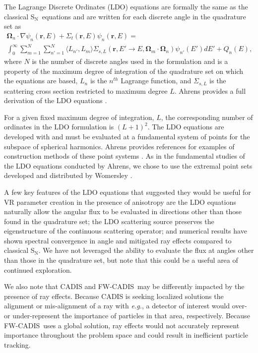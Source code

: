\documentclass{article} %
\newcommand{\bo}{\mathbf\Omega}
\newcommand{\vecr}{\textbf{r}}
\newcommand{\sn}{S$_\mathrm{N}$}
\newcommand{\fwc}{\mbox{FW-CADIS}}
\begin{document}
The Lagrange Discrete Ordinates (LDO) equations are formally the same as the
classical \sn\ equations and are written for each discrete angle in the quadrature
set as
%
\begin{multline}
\bo_n\cdot\nabla\psi_{n}(\vecr,E) + 
\Sigma_{t}(\vecr,E)\psi_{n}(\vecr,E) = \\
\int_0^\infty\sum_{m=1}^{N}\sum_{n'=1}^{N}\langle L_{n'},L_{m}\rangle
\Sigma_{s,L}(\vecr,E'\rightarrow E,\bo_{m}\cdot\bo_n)\psi_{n'}(E')dE'
+ Q_{n}(E),
\end{multline}
%
where $N$ is the number of discrete angles used in the formulation
and is a property of the maximum degree of integration of the quadrature set
on which the equations are based, $L_n$ is the $n^{th}$ Lagrange function, and
$\Sigma_{s,L}$ is the scattering cross section restricted to maximum degree
$L$. Ahrens provides a full derivation of the LDO equations \cite{ahrens}.

For a given fixed maximum degree of integration, $L$, the corresponding number
of ordinates in the LDO formulation is $(L+1)^2$. The LDO equations are
developed with and must be evaluated at a fundamental system of points for the
subspace of spherical harmonics. Ahrens provides references for examples of
construction methods of these point systems \cite{ahrens}. As in the
fundamental studies of the LDO equations conducted by Ahrens, we chose to use
the extremal point sets developed and distributed by Womersley \cite{wom}.

A few key features of the LDO equations that suggested they would be useful for VR parameter creation in the presence of anisotropy are the LDO equations naturally allow the angular flux to be evaluated in directions other than those found in the quadrature set; the LDO scattering source preserves the eigenstructure of the continuous scattering operator; and numerical results have shown spectral convergence in angle and mitigated ray effects compared to classical \sn \citep{ahrens}. We have not leveraged the ability to evaluate the flux at angles other than those in the quadrature set, but note that this could be a useful area of continued exploration. 

We also note that CADIS and \fwc\ may be differently impacted by the presence of ray effects. Because CADIS is seeking localized solutions the alignment or mis-alignment of a ray with \textit{e.g.}, a detector of interest would over- or under-represent the importance of particles in that area, respectively. Because \fwc\ uses a global solution, ray effects would not accurately represent importance throughout the problem space and could result in inefficient particle tracking. 
\end{document}
